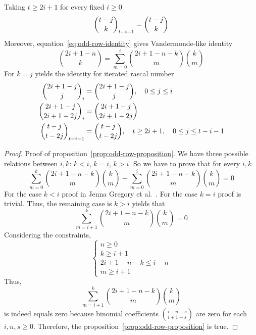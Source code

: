 Taking $t \geq 2i+1$ for every fixed $i \geq 0$
\begin{align*}
    \binom{t-j}{k}_{t-i-1}= \binom{t-j}{k}
\end{align*}
Moreover, equation~\eqref{eq:odd-row-identity} gives Vandermonde-like identity
\begin{equation*}
    \binom{2i+1-n}{k} = \sum_{m=0}^{i} \binom{2i+1-n-k}{m} \binom{k}{m}
\end{equation*}
For $k=j$ yields the identity for iterated rascal number
\begin{align*}
    \binom{2i+1-j}{j}_{i}         &= \binom{2i+1-j}{j}, \quad 0 \leq j \leq i \\
    \binom{2i+1-j}{2i+1-2j}_{i}   &= \binom{2i+1-j}{2i+1-2j} \\
    \binom{t-j}{t-2j}_{t-i-1}     &= \binom{t-j}{t-2j}, \quad t \geq 2i+1, \quad 0 \leq j \leq t-i-1
\end{align*}
\begin{proof}
    Proof of proposition~\ref{prop:odd-row-proposition}.
    We have three possible relations between $i,k$: $k<i$, $k=i$, $k > i$.
    So we have to prove that for every $i,k$
    \begin{equation*}
        \sum_{m=0}^{k} \binom{2i+1-n-k}{m} \binom{k}{m} - \sum_{m=0}^{i} \binom{2i+1-n-k}{m} \binom{k}{m} = 0
    \end{equation*}
    For the case $k<i$ proof in Jenna Gregory et al.~\cite{gregory2023iterated}.
    For the case $k=i$ proof is trivial.
    Thus, the remaining case is $k>i$ yields that
    \begin{equation*}
        \sum_{m=i+1}^{k} \binom{2i+1-n-k}{m} \binom{k}{m} = 0
    \end{equation*}
    Considering the constraints,
    \begin{equation*}
        \begin{cases}
            n \geq 0 \\
            k \geq i+1 \\
            2i+1-n-k \leq i-n \\
            m \geq i+1
        \end{cases}
    \end{equation*}
    Thus,
    \begin{equation*}
        \sum_{m=i+1}^{k} \binom{2i+1-n-k}{m} \binom{k}{m}
    \end{equation*}
    is indeed equals zero because binomial coefficients $\binom{i-n-s}{i+1+s}$ are zero for each $i, n, s \geq 0$.
    Therefore, the proposition~\eqref{prop:odd-row-proposition} is true.
\end{proof}
